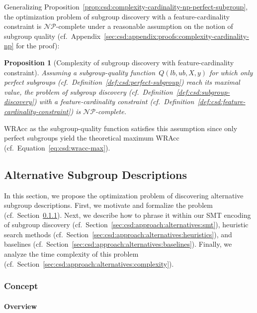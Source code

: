 \documentclass{article}
\newtheorem{proposition}{Proposition}
\theoremstyle{definition}
\begin{document}
Generalizing Proposition~\ref{prop:csd:complexity-cardinality-np-perfect-subgroup}, the optimization problem of subgroup discovery with a feature-cardinality constraint is $\mathcal{NP}$-complete under a reasonable assumption on the notion of subgroup quality (cf.~Appendix~\ref{sec:csd:appendix:proofs:complexity-cardinality-np} for the proof):
%
\begin{proposition}[Complexity of subgroup discovery with feature-cardinality constraint]
	Assuming a subgroup-quality function~$Q(\mathit{lb}, \mathit{ub}, X, y)$ for which only perfect subgroups (cf.~Definition~\ref{def:csd:perfect-subgroup}) reach its maximal value,
	the problem of subgroup discovery (cf.~Definition~\ref{def:csd:subgroup-discovery}) with a feature-cardinality constraint (cf.~Definition~\ref{def:csd:feature-cardinality-constraint}) is $\mathcal{NP}$-complete.
	\label{prop:csd:complexity-cardinality-np}
\end{proposition}
%
WRAcc as the subgroup-quality function satisfies this assumption since only perfect subgroups yield the theoretical maximum WRAcc (cf.~Equation~\ref{eq:csd:wracc-max}).

\subsection{Alternative Subgroup Descriptions}
\label{sec:csd:approach:alternatives}

In this section, we propose the optimization problem of discovering alternative subgroup descriptions.
First, we motivate and formalize the problem (cf.~Section~\ref{sec:csd:approach:alternatives:concept}).
Next, we describe how to phrase it within our SMT encoding of subgroup discovery (cf.~Section~\ref{sec:csd:approach:alternatives:smt}), heuristic search methods (cf.~Section~\ref{sec:csd:approach:alternatives:heuristics}), and baselines (cf.~Section~\ref{sec:csd:approach:alternatives:baselines}).
Finally, we analyze the time complexity of this problem (cf.~Section~\ref{sec:csd:approach:alternatives:complexity}).

\subsubsection{Concept}
\label{sec:csd:approach:alternatives:concept}

\paragraph{Overview}
\end{document}
